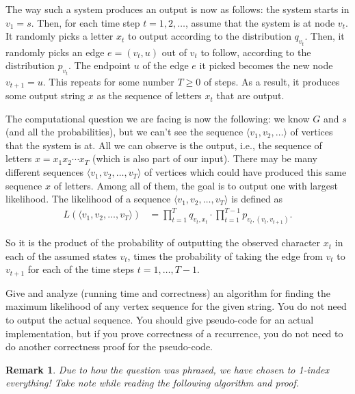 \documentclass[10pt]{article}
\newtheorem{remark}[definition]{Remark}
\begin{document}
  The way such a system produces an output is now as follows: the system starts in $v_1 = s$. Then, for each time step $t=1, 2, \ldots$, assume that the system is at node $v_t$. It randomly picks a letter $x_t$ to output according to the distribution $q_{v_t}$. Then, it randomly picks an edge $e=(v_t,u)$ out of $v_t$ to follow, according to the distribution $p_{v_t}$. The endpoint $u$ of the edge $e$ it picked becomes the new node $v_{t+1} = u$. This repeats for some number $T \geq 0$ of steps. As a result, it produces some output string $x$ as the sequence of letters $x_t$ that are output.
  
  The computational question we are facing is now the following: we know $G$ and $s$ (and all the probabilities), but we can't see the sequence $\langle v_1, v_2, \ldots \rangle$ of vertices that the system is at. All we can observe is the output, i.e., the sequence of letters $x = x_1 x_2 \cdots x_T$ (which is also part of our input).
  There may be many different sequences $\langle v_1, v_2, \ldots, v_T \rangle$ of vertices which could have produced this same sequence $x$ of letters.
  Among all of them, the goal is to output one with largest likelihood.
  The likelihood of a sequence $\langle v_1, v_2, \ldots, v_T \rangle$ is defined as
  \begin{align*}
    L(\langle v_1, v_2, \ldots, v_T \rangle)
    & = \prod_{t=1}^T q_{v_t,x_t} \cdot \prod_{t=1}^{T-1} p_{v_t,(v_t,v_{t+1})}.
  \end{align*}

  So it is the product of the probability of outputting the observed character $x_t$ in each of the assumed states $v_t$, times the probability of taking the edge from $v_t$ to $v_{t+1}$ for each of the time steps $t=1, \ldots, T-1$.
  
  Give and analyze (running time and correctness) an algorithm for finding the maximum likelihood of any vertex sequence for the given string.
  You do not need to output the actual sequence. You should give pseudo-code for an actual implementation, but if you prove correctness of a recurrence, you do not need to do another correctness proof for the pseudo-code.

\begin{remark}
  Due to how the question was phrased, we have chosen to 1-index everything! Take note while reading the following algorithm and proof.
\end{remark}
\end{document}
